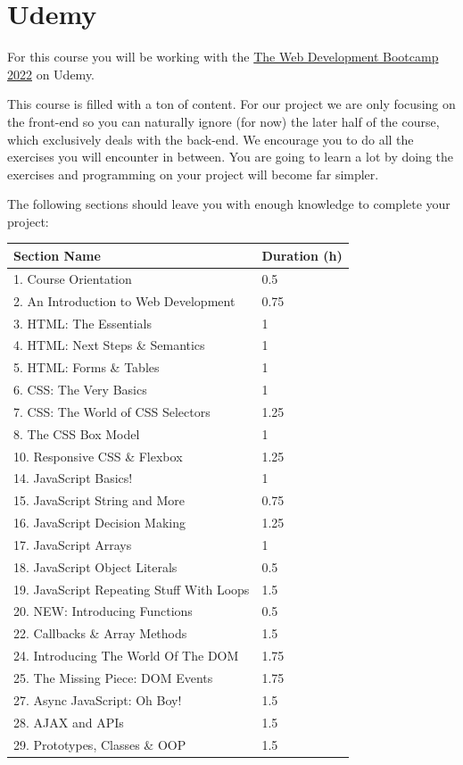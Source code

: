 \documentclass[
]{book}
\begin{document}
\hypertarget{udemy}{%
\section{Udemy}\label{udemy}}

For this course you will be working with the \href{https://www.udemy.com/course/the-web-developer-bootcamp/}{The Web Development Bootcamp 2022} on Udemy.

This course is filled with a ton of content. For our project we are only focusing on the front-end so you can naturally ignore (for now) the later half of the course, which exclusively deals with the back-end. We encourage you to do all the exercises you will encounter in between. You are going to learn a lot by doing the exercises and programming on your project will become far simpler.

The following sections should leave you with enough knowledge to complete your project:

\begin{longtable}[]{@{}ll@{}}
\toprule
Section Name & Duration (h) \\
\midrule
\endhead
1. Course Orientation & 0.5 \\
2. An Introduction to Web Development & 0.75 \\
3. HTML: The Essentials & 1 \\
4. HTML: Next Steps \& Semantics & 1 \\
5. HTML: Forms \& Tables & 1 \\
6. CSS: The Very Basics & 1 \\
7. CSS: The World of CSS Selectors & 1.25 \\
8. The CSS Box Model & 1 \\
10. Responsive CSS \& Flexbox & 1.25 \\
14. JavaScript Basics! & 1 \\
15. JavaScript String and More & 0.75 \\
16. JavaScript Decision Making & 1.25 \\
17. JavaScript Arrays & 1 \\
18. JavaScript Object Literals & 0.5 \\
19. JavaScript Repeating Stuff With Loops & 1.5 \\
20. NEW: Introducing Functions & 0.5 \\
22. Callbacks \& Array Methods & 1.5 \\
24. Introducing The World Of The DOM & 1.75 \\
25. The Missing Piece: DOM Events & 1.75 \\
27. Async JavaScript: Oh Boy! & 1.5 \\
28. AJAX and APIs & 1.5 \\
29. Prototypes, Classes \& OOP & 1.5 \\
\bottomrule
\end{longtable}
\end{document}
